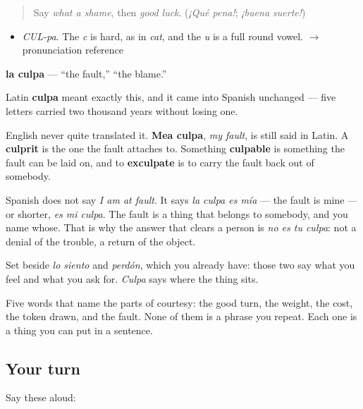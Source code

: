 \label{lesson:ES-C320-culpa}



\begin{quote}
Say \emph{what a shame}, then \emph{good luck}. (\emph{¡Qué pena!}; \emph{¡buena suerte!})
\end{quote}

\begin{sounds}
\begin{itemize}
\raggedright
  \item \emph{CUL-pa}. The \emph{c} is hard, as in \emph{cat}, and the \emph{u} is a full round vowel. $\to$ pronunciation reference
\end{itemize}
\end{sounds}

\begin{cousinweb}
\textbf{la culpa} — \textquotedblleft{}the fault,\textquotedblright{} \textquotedblleft{}the blame.\textquotedblright{}

Latin \textbf{culpa} meant exactly this, and it came into Spanish unchanged — five letters carried two thousand years without losing one.

English never quite translated it. \textbf{Mea culpa}, \emph{my fault}, is still said in Latin. A \textbf{culprit} is the one the fault attaches to. Something \textbf{culpable} is something the fault can be laid on, and to \textbf{exculpate} is to carry the fault back out of somebody.

Spanish does not say \emph{I am at fault}. It says \emph{la culpa es mía} — the fault is mine — or shorter, \emph{es mi culpa}. The fault is a thing that belongs to somebody, and you name whose. That is why the answer that clears a person is \emph{no es tu culpa}: not a denial of the trouble, a return of the object.

Set beside \emph{lo siento} and \emph{perdón}, which you already have: those two say what you feel and what you ask for. \emph{Culpa} says where the thing sits.
\end{cousinweb}

\begin{grammarlens}[title={What you've built}]
Five words that name the parts of courtesy: the good turn, the weight, the cost, the token drawn, and the fault. None of them is a phrase you repeat. Each one is a thing you can put in a sentence.
\end{grammarlens}

\subsection*{Your turn}
Say these aloud:

